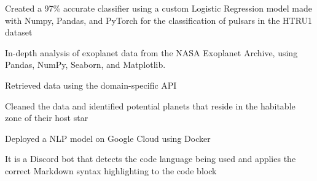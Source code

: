 \documentclass[]{resume-template}
\begin{document}
\begin{minipage}[t]{0.66\textwidth}
    \label{subsec:pulsar-identification}
    \begin{tightemize}
        \item Created a 97\% accurate classifier using a custom Logistic Regression model made with Numpy, Pandas, and PyTorch for the classification of pulsars in the HTRU1 dataset
    \end{tightemize}

    \label{subsec:exo-eda}
    \begin{tightemize}
        \item In-depth analysis of exoplanet data from the NASA Exoplanet Archive, using Pandas, NumPy,
        Seaborn, and Matplotlib.
        \item Retrieved data using the domain-specific API
        \item Cleaned the data and identified potential planets that reside in the habitable zone of their host star
    \end{tightemize}
    \vspace{\topsep}

    \label{subsec:pulsar-identification}
    \begin{tightemize}
        \item Deployed a NLP model on Google Cloud using Docker
        \item It is a Discord bot that detects the code language being used and applies the correct Markdown syntax highlighting to the code block
    \end{tightemize}



\end{minipage}
\end{document}
